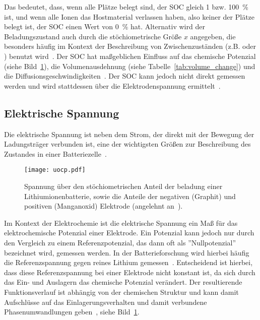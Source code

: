 Das bedeutet, dass, wenn alle Plätze belegt sind, der SOC gleich 1 bzw. 100~\% ist, und wenn alle Ionen das Hostmaterial verlassen haben, also keiner der Plätze belegt ist, der SOC einen Wert von 0~\% hat. Alternativ wird der Beladungszustand auch durch die stöchiometrische Größe $x$ angegeben, die besonders häufig im Kontext der Beschreibung von Zwischenzuständen (z.B.  oder ) benutzt wird~\cite{Newman2021}. Der SOC hat maßgeblichen Einfluss auf das chemische Potenzial (siehe Bild~\ref{fig:battery_voltage}), die Volumenausdehnung (siehe Tabelle~\ref{tab:volume_change}) und die Diffusionsgeschwindigkeiten~\cite{Plett2024}. Der SOC kann jedoch nicht direkt gemessen werden und wird stattdessen über die Elektrodenspannung ermittelt~\cite{Newman2021}.



\subsection{Elektrische Spannung}

Die elektrische Spannung ist neben dem Strom, der direkt mit der Bewegung der Ladungsträger verbunden ist, eine der wichtigsten Größen zur Beschreibung des Zustandes in einer Batteriezelle~\cite{Beard2019}. 

\begin{figure}[h]
    \center
		\texttt{[image: uocp.pdf]}
		\caption{\label{fig:battery_voltage}Spannung über den stöchiometrischen Anteil der beladung einer Lithiumionenbatterie, sowie die Anteile der negativen (Graphit) und positiven (Manganoxid) Elektrode (angelehnt an~\cite{Newman2021}).}
\end{figure}

Im Kontext der Elektrochemie ist die elektrische Spannung ein Maß für das elektrochemische Potenzial einer Elektrode. Ein Potenzial kann jedoch nur durch den Vergleich zu einem Referenzpotenzial, das dann oft als ''Nullpotenzial'' bezeichnet wird, gemessen werden. In der Batterieforschung wird hierbei häufig die Referenzspannung gegen reines Lithium gemessen~\cite{Newman2021}. Entscheidend ist hierbei, dass diese Referenzspannung bei einer Elektrode nicht konstant ist, da sich durch das Ein- und Auslagern das chemische Potenzial verändert. Der resultierende Funktionsverlauf ist abhängig von der chemischen Struktur und kann damit Aufschlüsse auf das Einlagerungsverhalten und damit verbundene Phasenumwandlungen geben~\cite{Plett2015}, siehe Bild~\ref{fig:battery_voltage}.

